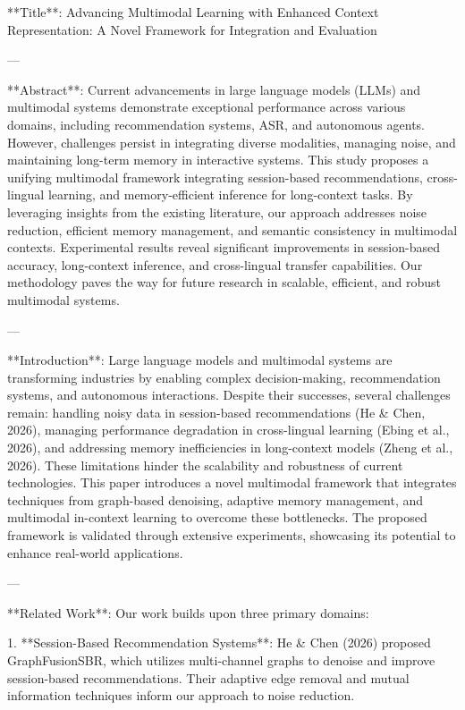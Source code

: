 **Title**: Advancing Multimodal Learning with Enhanced Context Representation: A Novel Framework for Integration and Evaluation

---

**Abstract**:  
Current advancements in large language models (LLMs) and multimodal systems demonstrate exceptional performance across various domains, including recommendation systems, ASR, and autonomous agents. However, challenges persist in integrating diverse modalities, managing noise, and maintaining long-term memory in interactive systems. This study proposes a unifying multimodal framework integrating session-based recommendations, cross-lingual learning, and memory-efficient inference for long-context tasks. By leveraging insights from the existing literature, our approach addresses noise reduction, efficient memory management, and semantic consistency in multimodal contexts. Experimental results reveal significant improvements in session-based accuracy, long-context inference, and cross-lingual transfer capabilities. Our methodology paves the way for future research in scalable, efficient, and robust multimodal systems.

---

**Introduction**:  
Large language models and multimodal systems are transforming industries by enabling complex decision-making, recommendation systems, and autonomous interactions. Despite their successes, several challenges remain: handling noisy data in session-based recommendations (He & Chen, 2026), managing performance degradation in cross-lingual learning (Ebing et al., 2026), and addressing memory inefficiencies in long-context models (Zheng et al., 2026). These limitations hinder the scalability and robustness of current technologies. This paper introduces a novel multimodal framework that integrates techniques from graph-based denoising, adaptive memory management, and multimodal in-context learning to overcome these bottlenecks. The proposed framework is validated through extensive experiments, showcasing its potential to enhance real-world applications.

---

**Related Work**:  
Our work builds upon three primary domains:  

1. **Session-Based Recommendation Systems**:  
   He & Chen (2026) proposed GraphFusionSBR, which utilizes multi-channel graphs to denoise and improve session-based recommendations. Their adaptive edge removal and mutual information techniques inform our approach to noise reduction.


